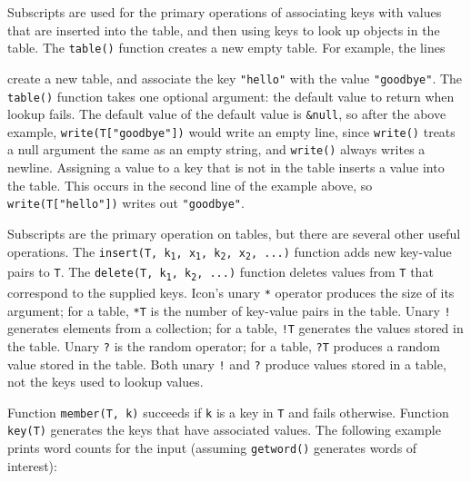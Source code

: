Subscripts are used for the primary operations of
associating keys with values that are inserted into the table, and then
using keys to look up objects in the table. The \texttt{table()}
function creates a new empty table. For example, the lines


\noindent
create a new table, and associate the key \texttt{"hello"} with the value
\texttt{"goodbye"}. The \texttt{table()} function takes one optional argument:
the default value to return when lookup
fails. The default value of the default value is
\texttt{\&null}, so after the above example, \texttt{write(T["goodbye"])} would
write an empty line, since \texttt{write()} treats a null argument the same as
an empty string, and \texttt{write()} always writes a newline.  Assigning a
value to a key that is not in the table inserts a value into the table. This
occurs in the second line of the example above, so \texttt{write(T["hello"])}
writes out \texttt{"goodbye"}.

Subscripts are the primary operation on tables, but there are several
other useful operations. The \texttt{insert(T,
k}\texttt{\textsubscript{1}}\texttt{,
x}\texttt{\textsubscript{1}}\texttt{,
k}\texttt{\textsubscript{2}}\texttt{,
x}\texttt{\textsubscript{2}}\texttt{, ...)} function adds new key-value
pairs to \texttt{T}. The \texttt{delete(T,
k}\texttt{\textsubscript{1}}\texttt{,
k}\texttt{\textsubscript{2}}\texttt{, ...)} function deletes values
from \texttt{T} that correspond to the supplied keys.
Icon's unary \texttt{*} operator produces the size of
its argument; for a table, \texttt{*T} is the
number of key-value pairs in the table. Unary \texttt{!} generates
elements from a collection; for a table, \texttt{!T} generates the
values stored in the table. Unary \texttt{?} is the random operator;
for a table, \texttt{?T} produces a random value stored in the table.
Both unary \texttt{!} and \texttt{?} produce values stored in a table,
not the keys used to lookup values.

Function \texttt{member(T, k)} succeeds if
\texttt{k} is a key in \texttt{T} and fails otherwise. Function
\texttt{key(T)} generates the keys that have
associated values. The following example prints word counts for the
input (assuming \texttt{getword()} generates words of
interest): 

